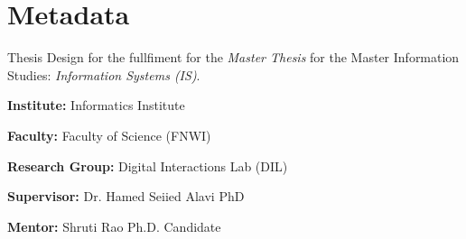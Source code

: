 \section*{Metadata}

Thesis Design for the fullfiment for the \emph{Master Thesis} for the Master Information Studies: \emph{Information Systems (IS)}. \\

\item \textbf{Institute:} Informatics Institute
\item \textbf{Faculty:} Faculty of Science (FNWI)
\item \textbf{Research Group:} Digital Interactions Lab (DIL)
\item \textbf{Supervisor:} Dr. Hamed Seiied Alavi PhD
\item \textbf{Mentor:} Shruti Rao Ph.D. Candidate